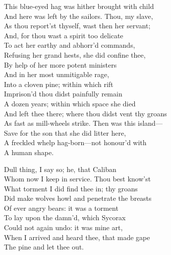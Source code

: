 	
\begin{verse_speech}[Prospero] 
This blue-eyed hag was hither brought with child\\
And here was left by the sailors. Thou, my slave,\\
As thou report'st thyself, wast then her servant;\\
And, for thou wast a spirit too delicate\\
To act her earthy and abhorr'd commands,\\
Refusing her grand hests, she did confine thee,\\
By help of her more potent ministers\\
And in her most unmitigable rage,\\
Into a cloven pine; within which rift\\
Imprison'd thou didst painfully remain\\
A dozen years; within which space she died\\
And left thee there; where thou didst vent thy groans\\
As fast as mill-wheels strike. Then was this island—\\
Save for the son that she did litter here,\\
A freckled whelp hag-born—not honour'd with\\
A human shape.
\end{verse_speech}

	
\begin{verse_speech}[Prospero] 
Dull thing, I say so; he, that Caliban\\
Whom now I keep in service. Thou best know'st\\
What torment I did find thee in; thy groans\\
Did make wolves howl and penetrate the breasts\\
Of ever angry bears: it was a torment\\
To lay upon the damn'd, which Sycorax\\
Could not again undo: it was mine art,\\
When I arrived and heard thee, that made gape\\
The pine and let thee out.
\end{verse_speech}

	
